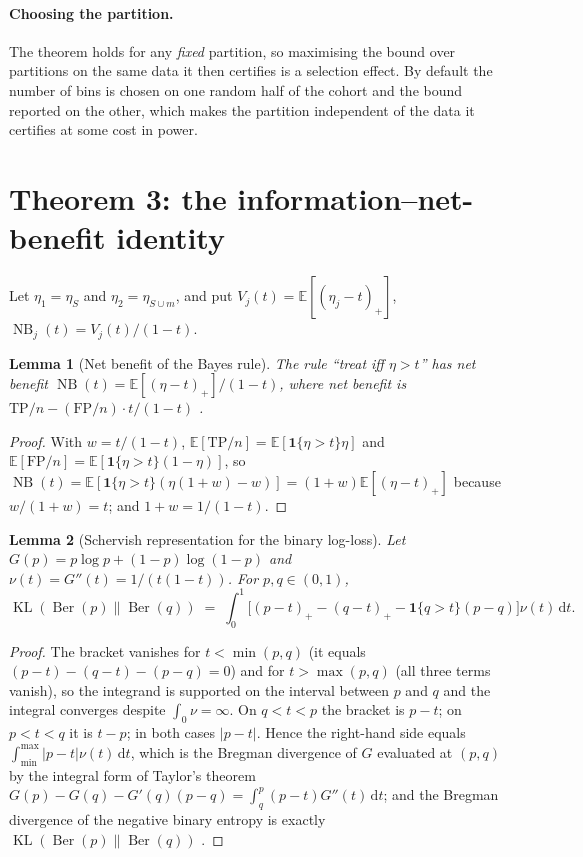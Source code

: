 \documentclass[11pt]{article}
\newtheorem{lemma}{Lemma}
\theoremstyle{definition}
\theoremstyle{remark}
\DeclareMathOperator{\KL}{KL}
\DeclareMathOperator{\NB}{NB}
\DeclareMathOperator{\Ber}{Ber}
\newcommand{\E}{\mathbb{E}}
\begin{document}
\paragraph{Choosing the partition.} The theorem holds for any \emph{fixed}
partition, so maximising the bound over partitions on the same data it then
certifies is a selection effect. By default the number of bins is chosen on one
random half of the cohort and the bound reported on the other, which makes the
partition independent of the data it certifies at some cost in power.

\section{Theorem 3: the information--net-benefit identity}
\label{sec:s-identity}
\label{sec:thm3}

Let $\eta_1=\eta_S$ and $\eta_2=\eta_{S\cup m}$, and put
$V_j(t)=\E[(\eta_j-t)_+]$, $\NB_j(t)=V_j(t)/(1-t)$.

\begin{lemma}[Net benefit of the Bayes rule]
\label{lem:nb}
The rule ``treat iff $\eta>t$'' has net benefit
$\NB(t)=\E[(\eta-t)_+]/(1-t)$, where net benefit is
$\mathrm{TP}/n-(\mathrm{FP}/n)\cdot t/(1-t)$ \citep{vickers2006decision}.
\end{lemma}

\begin{proof}
With $w=t/(1-t)$, $\E[\mathrm{TP}/n]=\E[\mathbf 1\{\eta>t\}\eta]$ and
$\E[\mathrm{FP}/n]=\E[\mathbf 1\{\eta>t\}(1-\eta)]$, so
$\NB(t)=\E[\mathbf 1\{\eta>t\}(\eta(1+w)-w)]=(1+w)\E[(\eta-t)_+]$
because $w/(1+w)=t$; and $1+w=1/(1-t)$.
\end{proof}

\begin{lemma}[Schervish representation for the binary log-loss]
\label{lem:scherv}
Let $G(p)=p\log p+(1-p)\log(1-p)$ and $\nu(t)=G''(t)=1/(t(1-t))$. For
$p,q\in(0,1)$,
\[
\KL(\Ber(p)\|\Ber(q)) \;=\; \int_0^1\Big[(p-t)_+-(q-t)_+-\mathbf 1\{q>t\}(p-q)\Big]\nu(t)\,\mathrm{d}t .
\]
\end{lemma}

\begin{proof}
The bracket vanishes for $t<\min(p,q)$ (it equals $(p-t)-(q-t)-(p-q)=0$) and for
$t>\max(p,q)$ (all three terms vanish), so the integrand is supported on the
interval between $p$ and $q$ and the integral converges despite
$\int_0\nu=\infty$. On $q<t<p$ the bracket is $p-t$; on $p<t<q$ it is $t-p$; in
both cases $|p-t|$. Hence the right-hand side equals
$\int_{\min}^{\max}|p-t|\nu(t)\,\mathrm{d}t$, which is the Bregman divergence of
$G$ evaluated at $(p,q)$ by the integral form of Taylor's theorem
$G(p)-G(q)-G'(q)(p-q)=\int_q^p (p-t)G''(t)\,\mathrm{d}t$; and the Bregman
divergence of the negative binary entropy is exactly
$\KL(\Ber(p)\|\Ber(q))$ \citep{schervish1989general}.
\end{proof}
\end{document}
